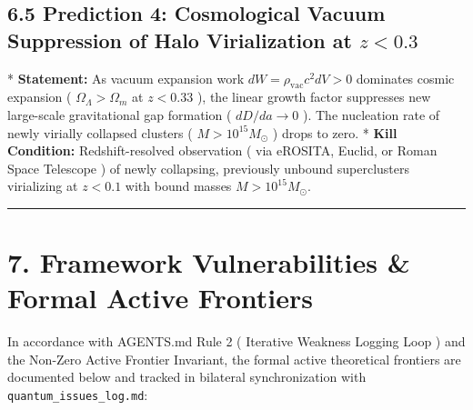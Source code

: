 \documentclass[11pt,a4paper]{article}
\theoremstyle{definition}\newtheorem{definition}{Definition}
\theoremstyle{remark}\newtheorem{remark}{Remark}
\begin{document}
\subsection{6.5 Prediction 4: Cosmological Vacuum Suppression of Halo Virialization at $z < 0.3$}

* \textbf{Statement:} As vacuum expansion work $dW = \rho_{\text{vac}} c^2 dV > 0$ dominates cosmic expansion ( $\Omega_\Lambda > \Omega_m$ at $z < 0.33$ ), the linear growth factor suppresses new large-scale gravitational gap formation ( $dD/da \to 0$ ). The nucleation rate of newly virially collapsed clusters ( $M > 10^{15} M_\odot$ ) drops to zero.
* \textbf{Kill Condition:} Redshift-resolved observation ( via eROSITA, Euclid, or Roman Space Telescope ) of newly collapsing, previously unbound superclusters virializing at $z < 0.1$ with bound masses $M > 10^{15} M_\odot$.

\noindent\rule{\linewidth}{0.4pt}
\section{7. Framework Vulnerabilities \& Formal Active Frontiers}

In accordance with AGENTS.md Rule 2 ( Iterative Weakness Logging Loop ) and the Non-Zero Active Frontier Invariant, the formal active theoretical frontiers are documented below and tracked in bilateral synchronization with \texttt{quantum_issues_log.md}:
\end{document}
